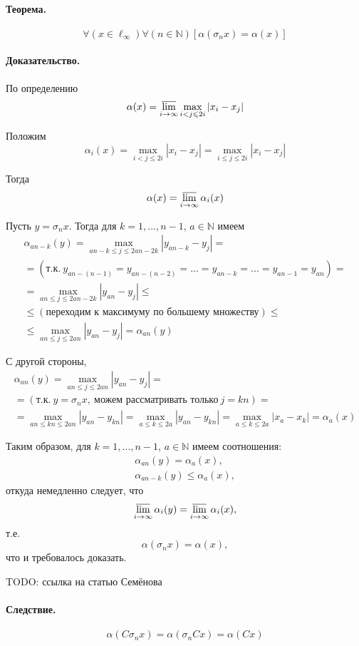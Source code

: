 \paragraph{Теорема.}
$$
	\forall(x\in \ell_\infty) \forall(n\in\mathbb{N})
	[
		\alpha(\sigma_n x) = \alpha(x)
	]
$$

\paragraph{Доказательство.}
По определению
\begin{equation}
	\alpha(x) = \varlimsup_{i\to\infty} \max_{i<j\leqslant 2i} |x_i - x_j|
\end{equation}

Положим
\begin{equation}
	\alpha_i(x) =
	\max_{i<j\leqslant 2i} |x_i - x_j| =
	\max_{i\leqslant j\leqslant 2i} |x_i - x_j|
\end{equation}

Тогда
\begin{equation}
	\alpha(x) = \varlimsup_{i\to\infty} \alpha_i(x)
\end{equation}

Пусть $y = \sigma_n x$.
Тогда для $k=1, ..., n-1$, $a\in\mathbb{N}$ имеем
\begin{multline}
	\alpha_{an-k}(y) =
	\max_{an-k \leqslant j \leqslant 2an-2k} |y_{an-k} - y_j| =
	\\=
	(\mbox{т.к.}~y_{an-(n-1)}=y_{an-(n-2)}=...=y_{an-k}=...=y_{an-1}=y_{an})=
	\\=
	\max_{an \leqslant j \leqslant 2an-2k} |y_{an} - y_j| \leqslant
	\\ \leqslant
	(\mbox{переходим к максимуму по большему множеству}) \leqslant
	\\ \leqslant
	\max_{an \leqslant j \leqslant 2an} |y_{an} - y_j| =
	\alpha_{an}(y)
\end{multline}

С другой стороны,
\begin{multline}
	\alpha_{an}(y) =
	\max_{an \leqslant j \leqslant 2an} |y_{an} - y_j| =
	\\ =
	(\mbox{т.к.}~y=\sigma_n x,~\mbox{можем рассматривать только}~j=kn)=
	\\ =
	\max_{an \leqslant kn \leqslant 2an} |y_{an} - y_{kn}| =
	\max_{a \leqslant k \leqslant 2a} |y_{an} - y_{kn}| =
	\max_{a \leqslant k \leqslant 2a} |x_a - x_k| =
	\alpha_a(x)
\end{multline}

Таким образом, для $k=1, ..., n-1$, $a\in\mathbb{N}$ имеем соотношения:
\begin{gather}
	\alpha_{an}(y) = \alpha_a(x),
\\
	\alpha_{an-k}(y) \leqslant \alpha_a(x),
\end{gather}
откуда немедленно следует, что
\begin{equation}
	\varlimsup_{i\to\infty} \alpha_i(y) =
	\varlimsup_{i\to\infty} \alpha_i(x),
\end{equation}
т.е.
\begin{equation}
	\alpha(\sigma_n x) = \alpha(x),
\end{equation}
что и требовалось доказать.

TODO: ссылка на статью Семёнова

\paragraph{Следствие.}
$$
	\alpha(C\sigma_n x) =
	\alpha(\sigma_n Cx) =
	\alpha(Cx)
$$
